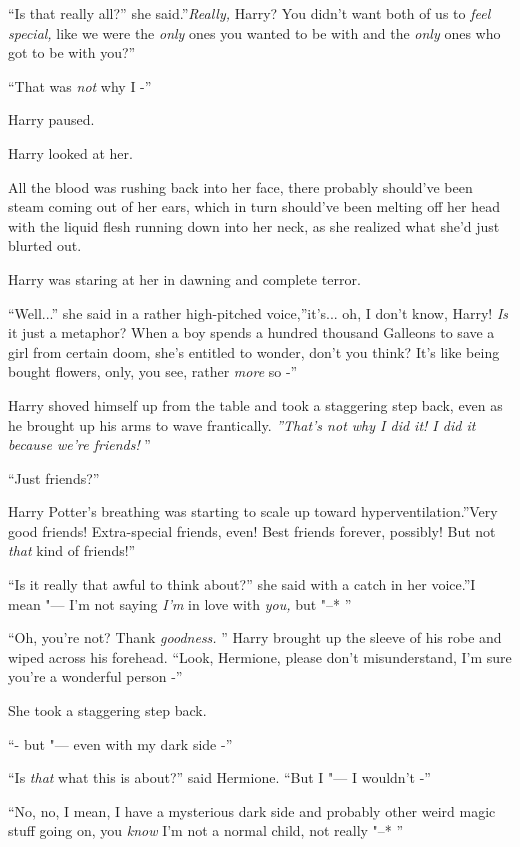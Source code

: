 ``Is that really all?'' she said.''\emph{Really,} Harry? You didn't want
both of us to \emph{feel special,} like we were the \emph{only} ones you
wanted to be with and the \emph{only} ones who got to be with you?''

``That was \emph{not} why I -''

Harry paused.

Harry looked at her.

All the blood was rushing back into her face, there probably should've
been steam coming out of her ears, which in turn should've been melting
off her head with the liquid flesh running down into her neck, as she
realized what she'd just blurted out.

Harry was staring at her in dawning and complete terror.

``Well...'' she said in a rather high-pitched voice,''it's...
oh, I don't know, Harry! \emph{Is} it just a metaphor? When a boy spends
a hundred thousand Galleons to save a girl from certain doom, she's
entitled to wonder, don't you think? It's like being bought flowers,
only, you see, rather \emph{more} so -''

Harry shoved himself up from the table and took a staggering step back,
even as he brought up his arms to wave frantically. \emph{''That's not
why I did it! I did it because we're friends!} ''

``Just friends?''

Harry Potter's breathing was starting to scale up toward
hyperventilation.''Very good friends! Extra-special friends, even! Best
friends forever, possibly! But not \emph{that} kind of friends!''

``Is it really that awful to think about?'' she said with a catch in her
voice.''I mean "--- I'm not saying \emph{I'm} in love with \emph{you,} but
"--* ''

``Oh, you're not? Thank \emph{goodness.} '' Harry brought up the sleeve of
his robe and wiped across his forehead. ``Look, Hermione, please don't
misunderstand, I'm sure you're a wonderful person -''

She took a staggering step back.

``- but "--- even with my dark side -''

``Is \emph{that} what this is about?'' said Hermione. ``But I "--- I
wouldn't -''

``No, no, I mean, I have a mysterious dark side and probably other weird
magic stuff going on, you \emph{know} I'm not a normal child, not really
"--* ''

